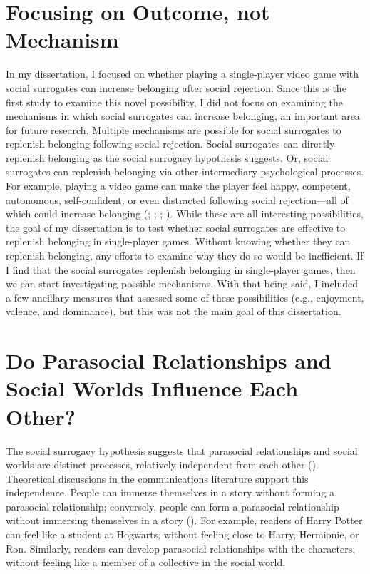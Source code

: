 \documentclass[
]{udthesis}
\begin{document}
\section{Focusing on Outcome, not Mechanism}\label{focusing-on-outcome-not-mechanism}

In my dissertation, I focused on whether playing a single-player video
game with social surrogates can increase belonging after social
rejection. Since this is the first study to examine this novel
possibility, I did not focus on examining the mechanisms in which
social surrogates can increase belonging, an important area for future
research. Multiple mechanisms are possible for social surrogates to
replenish belonging following social rejection. Social surrogates can
directly replenish belonging as the social surrogacy hypothesis
suggests. Or, social surrogates can replenish belonging via other
intermediary psychological processes. For example, playing a video game
can make the player feel happy, competent, autonomous, self-confident,
or even distracted following social rejection---all of which could
increase belonging (; ; ; ). While these are all interesting possibilities, the goal
of my dissertation is to test whether social surrogates are effective to
replenish belonging in single-player games. Without knowing whether they
can replenish belonging, any efforts to examine why they do so would be
inefficient. If I find that the social surrogates replenish belonging in
single-player games, then we can start investigating possible
mechanisms. With that being said, I included a few ancillary measures
that assessed some of these possibilities (e.g., enjoyment, valence, and
dominance), but this was not the main goal of this dissertation.

\section{Do Parasocial Relationships and Social Worlds Influence Each Other?}\label{do-parasocial-relationships-and-social-worlds-influence-each-other}

The social surrogacy hypothesis suggests that parasocial relationships
and social worlds are distinct processes, relatively independent from
each other (). Theoretical discussions in the communications
literature support this independence. People can immerse themselves in a
story without forming a parasocial relationship; conversely, people can
form a parasocial relationship without immersing themselves in a story
(). For example, readers of Harry Potter
can feel like a student at Hogwarts, without feeling close to Harry,
Hermionie, or Ron. Similarly, readers can develop parasocial
relationships with the characters, without feeling like a member of a
collective in the social world.
\end{document}
